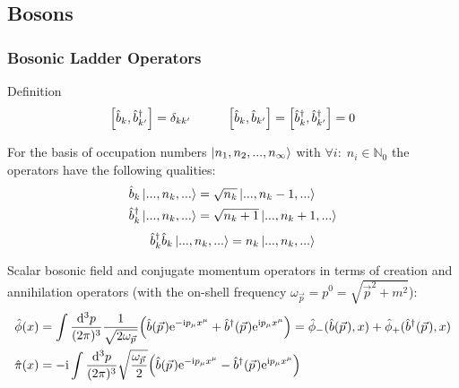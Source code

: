 	\subsection{Bosons}
		\subsubsection{Bosonic Ladder Operators}
		\label{Sec:BosonicCreationAndAnnihilationOperators}
			Definition
			\begin{equation}
				\comm{\hat{b}_k}{\hat{b}_{k'}^\dagger} = \delta_{kk'}
				\hsp
				\comm{\hat{b}_k}{\hat{b}_{k'}} = \comm{\hat{b}_k^\dagger}{\hat{b}_{k'}^\dagger} = 0
			\end{equation}

			\noindent
			For the basis of occupation numbers $\Ket{n_1, n_2, ..., n_\infty}$ with $\forall i:\;n_i\in \mathbb{N}_0$ the operators have the following qualities:
			\begin{equation}
				\begin{aligned}
					\hat{b}_k \Ket{...,n_k,...} &= \sqrt{n_k} \Ket{...,n_k-1,...} \\
					\hat{b}_k^\dagger \Ket{...,n_k,...} &= \sqrt{n_k+1} \Ket{...,n_k+1,...} \\
				\end{aligned}
			\end{equation}
			\begin{equation}
				\hat{b}_k^\dagger \hat{b}_k \Ket{...,n_k,...} = n_k \Ket{...,n_k,...}
			\end{equation}

			\noindent
			Scalar bosonic field and conjugate momentum operators in terms of creation and annihilation operators (with the on-shell frequency $\omega_{\vec{p}} = p^0 = \sqrt{\vec{p}^2 + m^2}$):
			\begin{equation}
				 \begin{aligned}
					\hat{\phi}(x) &= \int \frac{\dd^3 p}{(2\pi)^3} \frac{1}{\sqrt{2 \omega_{\vec{p}}}} \qty( \hat{b}(\vec{p}) \ex^{-\i p_\mu x^\mu} + \hat{b}^\dagger(\vec{p}) \ex^{\i p_\mu x^\mu} ) = \hat{\phi}_{-}(\hat{b}(\vec{p}),x) + \hat{\phi}_{+}(\hat{b}^\dagger(\vec{p}),x) \\
					\hat{\pi}(x) &= -\i \int \frac{\dd^3 p}{(2\pi)^3} \sqrt{\frac{\omega_{\vec{p}}}{2}} \qty( \hat{b}(\vec{p}) \ex^{-\i p_\mu x^\mu} - \hat{b}^\dagger(\vec{p}) \ex^{\i p_\mu x^\mu} ) \\
				 \end{aligned}
			\end{equation}
			
